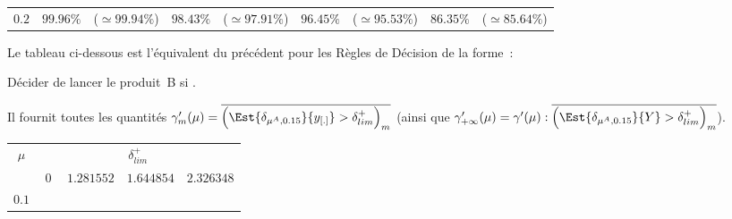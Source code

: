 \documentclass[10pt]{report}
\begin{document}
\begin{exercice}
\begin{center}
\begin{tabular}{|c|rl|rl|rl|rl|}
    \\ 

    
        $0.2$
         & 
    
        $99.96\%$
         & 
    
        ($\simeq99.94\%$)
         & 
    
        $98.43\%$
         & 
    
        ($\simeq97.91\%$)
         & 
    
        $96.45\%$
         & 
    
        ($\simeq95.53\%$)
         & 
    
        $86.35\%$
         & 
    
        ($\simeq85.64\%$)
        
    \\ \cline{1-9}

    \end{tabular}

\end{center}

\noindent Le tableau ci-dessous est l'équivalent du précédent pour les Règles de Décision de la forme~:
\begin{center}
Décider de lancer le produit~B si .
\end{center} 
Il fournit toutes les quantités $\gamma^\prime_m(\mu)=\overline{\Big(\Est{\delta_{\mu^A,0.15}}{y_{[.]}}>\delta^+_{lim}\Big)_m}$ (ainsi que $\gamma^\prime_{+\infty}(\mu)=\gamma^\prime(\mu):\overline{\Big(\Est{\delta_{\mu^A,0.15}}{Y}>\delta^+_{lim}\Big)_m}$).

\begin{center}
\begin{tabular}{|c|rl|rl|rl|rl|}\cline{1-9}
        \multirow{2}{*}{$\mu$}
         & 
    \multicolumn{8}{c|}{$\delta^+_{lim}$}
    
    
    
    
    
    
    
    \\ \cline{2-9}

    
        
         & 
    \multicolumn{2}{c|}{$0$}
     & 
    \multicolumn{2}{c|}{$1.281552$}
     & 
    \multicolumn{2}{c|}{$1.644854$}
     & 
    \multicolumn{2}{c|}{$2.326348$}
    
    \\ \cline{1-9}

    
        $0.1$
         & 
    

\end{tabular}
\end{center}
\end{exercice}
\end{document}
